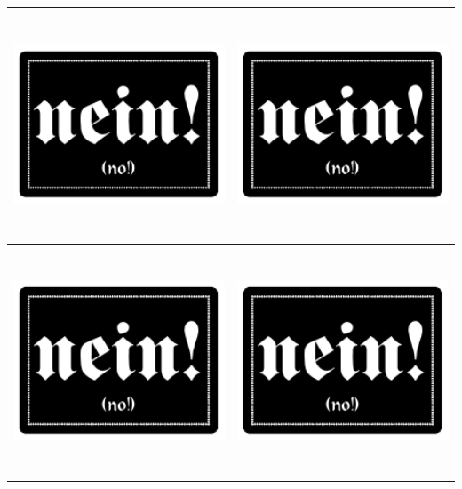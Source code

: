\documentclass[12pt,a4paper,spanish]{article}
\begin{document}
\begin{table}
\begin{tabular}{|c|c|}
			\midrule
			\includegraphics[height=6.74cm]{./Drawings/nein!.pdf} &
			\includegraphics[height=6.74cm]{./Drawings/nein!.pdf} \\
			\midrule
			\includegraphics[height=6.74cm]{./Drawings/nein!.pdf} &
			\includegraphics[height=6.74cm]{./Drawings/nein!.pdf} \\
			\bottomrule
		\end{tabular}
	\end{table}
\end{document}
